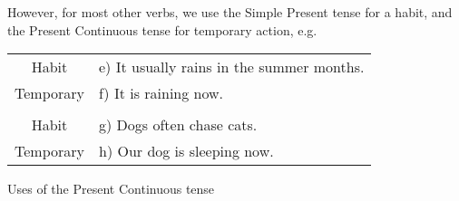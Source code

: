 However, for most other verbs, we use the Simple Present tense for a habit,
and the Present Continuous tense for temporary action, e.g.
\begin{center}
\begin{tabular}{|cl|}
    \hline
    Habit     & e) It usually rains in the summer months. \\
    Temporary & f) It is raining now. \\
              & \\
    Habit     & g) Dogs often chase cats. \\
    Temporary & h) Our dog is sleeping now. \\ \hline
\end{tabular}
\end{center}

Uses of the Present Continuous tense
